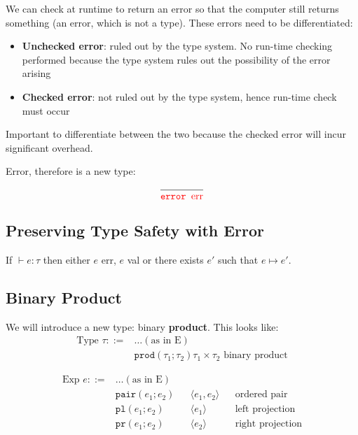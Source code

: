 \documentclass[11pt,a4paper,titlepage,dvipsnames,cmyk]{scrartcl}
\begin{document}
We can check at runtime to return an error so that the computer still returns something (an error, which is not a type). These errors need to be differentiated:
\begin{itemize}
    \item \textbf{Unchecked error}: ruled out by the type system. No run-time checking performed because the type system rules out the possibility of the error arising
    \item \textbf{Checked error}: not ruled out by the type system, hence run-time check must occur
\end{itemize}

Important to differentiate between the two because the checked error will incur significant overhead.

Error, therefore is a new type:
\begin{align*}
\frac{}{{\color{red}\texttt{error } \text{err}}}
\end{align*}

\subsection{Preserving Type Safety with Error}
\begin{tcolorbox} [space to upper,
collower=white,
title={Theorem Progress with Error},
nobeforeafter,
halign lower=flush right, ]
If $\vdash e : \tau$ then either $e$ {\color{red}err}, $e$ {\color{green}val} or there exists $e'$ such that $e \longmapsto e'$.
\end{tcolorbox}

\subsection{Binary Product}
We will introduce a new type: binary \textbf{product}. This looks like:
\begin{align*}
\text{Type } \tau ::= &\dots (\text{as in E}) \\
&\texttt{prod}(\tau_1;\tau_2) \tau_1 \times \tau_2 \text{ binary product}
\end{align*}

\begin{align*}
\text{Exp } e ::= &\dots (\text{as in E}) \\
&\texttt{pair}(e_1;e_2) &&\langle e_1, e_2 \rangle &&\text{ordered pair} \\
&\texttt{pl}(e_1;e_2) &&\langle e_1 \rangle &&\text{left projection} \\
&\texttt{pr}(e_1;e_2) &&\langle e_2 \rangle &&\text{right projection}
\end{align*}
\end{document}
